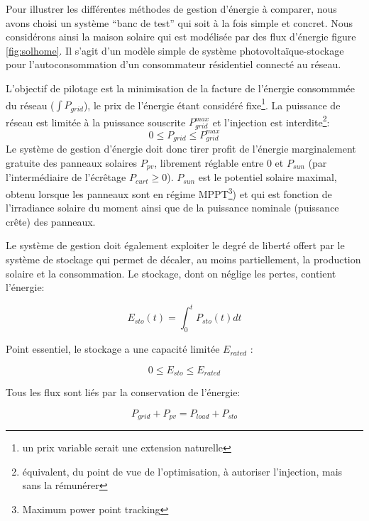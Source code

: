 \documentclass[a4paper,10pt,twocolumn]{article}
\begin{document}
Pour illustrer les différentes méthodes de gestion d'énergie à comparer,
nous avons choisi un système ``banc de test'' qui soit à la fois simple et concret.
Nous considérons ainsi la maison solaire qui est modélisée par
des flux d'énergie figure \ref{fig:solhome}.
Il s'agit d'un modèle simple de système photovoltaïque-stockage
pour l'autoconsommation d'un consommateur résidentiel connecté au réseau.

L'objectif de pilotage est la minimisation de la facture
de l'énergie consommmée du réseau ($\int P_{grid}$), le prix de l'énergie étant considéré fixe\footnote{un prix variable serait une extension naturelle}.
La puissance de réseau est limitée à la puissance souscrite $P_{grid}^{max}$
et l'injection est interdite\footnote{
équivalent, du point de vue de l'optimisation, à autoriser l'injection, mais sans la rémunérer}:
%
\begin{equation}
  0 \leq P_{grid} \leq P_{grid}^{max}
\end{equation}
%
Le système de gestion d'énergie doit donc tirer profit de l'énergie marginalement
gratuite des panneaux solaires $P_{pv}$, librement réglable entre 0 et $P_{sun}$
(par l'intermédiaire de l'écrêtage $P_{curt} \geq 0$).
$P_{sun}$ est le potentiel solaire maximal, obtenu lorsque les panneaux sont en régime
MPPT\footnote{Maximum power point tracking}) et qui est fonction de l'irradiance solaire du moment
ainsi que de la puissance nominale (puissance crête) des panneaux.

Le système de gestion doit également exploiter le degré de liberté offert par
le système de stockage qui permet de décaler, au moins partiellement,
la production solaire et la consommation. Le stockage, dont on néglige les pertes,
contient l'énergie:

\begin{equation}
  E_{sto}(t) = \int_0^t P_{sto}(t)dt
\end{equation}

Point essentiel, le stockage a une capacité limitée $E_{rated}$ :

\begin{equation}
  0 \leq E_{sto} \leq E_{rated}
\end{equation}

Tous les flux sont liés par la conservation de l'énergie:

\begin{equation}
  P_{grid} + P_{pv} = P_{load} + P_{sto}
\end{equation}
\end{document}
